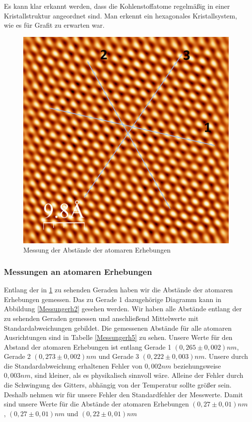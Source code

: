 \documentclass[10pt,a4paper]{article}
\begin{document}
Es kann klar erkannt werden, dass die Kohlenstoffatome regelmäßig in einer Kristallstruktur angeordnet sind. Man erkennt ein hexagonales Kristallsystem, wie es für Grafit zu erwarten war.

\begin{figure}[h]
	\centering

	\includegraphics[scale = 0.4]{Aufnahme_Ebene_doppelte_fourier2.png}

	\caption{Messung der Abstände der atomaren Erhebungen}
	\label{Messungerh1}
\end{figure}

\subsubsection{Messungen an atomaren Erhebungen} \label{kapitolo}

Entlang der in \ref{Messungerh1} zu sehenden Geraden haben wir die Abstände der atomaren Erhebungen gemessen. Das zu Gerade 1 dazugehörige Diagramm kann in Abbildung \ref{Messungerh2} gesehen werden. Wir haben alle Abstände entlang der zu sehenden Geraden gemessen und anschließend Mittelwerte mit Standardabweichungen gebildet. Die gemessenen Abstände für alle atomaren Ausrichtungen sind in Tabelle \ref{Messungerh5} zu sehen. Unsere Werte für den Abstand der atomaren Erhebungen ist entlang Gerade 1 $(0,265 \pm 0,002) nm$, Gerade 2 $(0,273 \pm 0,002) nm$ und Gerade 3 $(0,222 \pm 0,003) nm$. Unsere durch die Standardabweichung erhaltenen Fehler von $0,002 nm$ beziehungsweise $0,003 nm$, sind kleiner, als es physikalisch sinnvoll wäre. Alleine der Fehler durch die Schwingung des Gitters, abhängig von der Temperatur sollte größer sein. Deshalb nehmen wir für unsere Fehler den Standardfehler der Messwerte. Damit sind unsere Werte für die Abstände der atomaren Erhebungen $(0,27 \pm 0,01) nm$, $(0,27 \pm 0,01) nm$ und $(0,22 \pm 0,01) nm$
\end{document}
